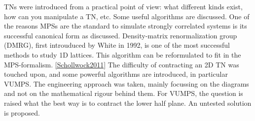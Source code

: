 \Glspl{TN} were introduced from a practical point of view: what different kinds exist, how can you manipulate a \Gls{TN}, etc. Some useful algorithms are discussed. One of the reasons \Glspl{MPS} are the standard to simulate strongly correlated systems is its successful canonical form as discussed.  Density-matrix renormalization group (DMRG), first introuduced by White in 1992, is one of the most successful methods to study 1D lattices. This algorithm can be reformulated to fit in the \Gls{MPS}-formalism. \cref{Schollwock2011} The difficulty of contracting an 2D \Gls{TN} was touched upon, and some powerful algorithms are introduced, in particular VUMPS. The engineering approach was taken, mainly focussing on the diagrams and not on the mathematical rigour behind them. For \Gls{VUMPS}, the question is raised what the best way is to contract the lower half plane. An untested solution is proposed.